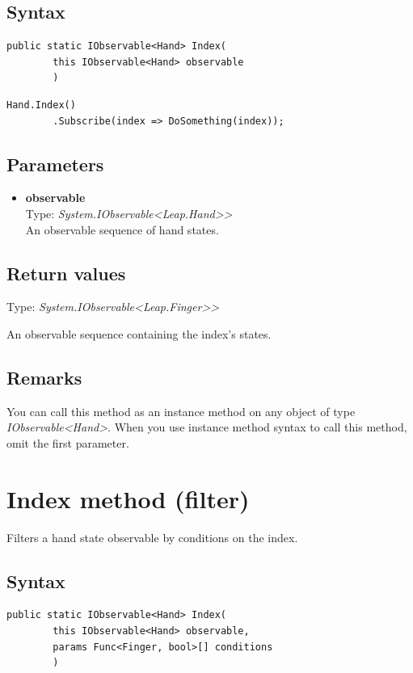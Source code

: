 \documentclass[12pt,a4paper,twoside]{report}
\begin{document}
\subsection{Syntax}
\begin{lstlisting}[caption=Declaration]
    public static IObservable<Hand> Index(
        this IObservable<Hand> observable
        )
\end{lstlisting}

\begin{lstlisting}[caption=Usage example]
    Hand.Index()
        .Subscribe(index => DoSomething(index));
\end{lstlisting}

\subsection{Parameters}
\begin{itemize}
    \item \textbf{observable}\\
    Type: \textit{System.IObservable<Leap.Hand>{}>}\\
    An observable sequence of hand states.
\end{itemize}

\subsection{Return values}
Type: \textit{System.IObservable<Leap.Finger>{}>}

An observable sequence containing the index's states.

\subsection{Remarks}
You can call this method as an instance method on any object of type \textit{IObservable<Hand>}. When you use 
instance method syntax to call this method, omit the first parameter.

\newpage

\section{Index method (filter)}
Filters a hand state observable by conditions on the index.

\subsection{Syntax}
\begin{lstlisting}[caption=Declaration]
    public static IObservable<Hand> Index(
        this IObservable<Hand> observable,
        params Func<Finger, bool>[] conditions
        )
\end{lstlisting}
\end{document}
